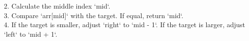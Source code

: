 \documentclass[preview]{standalone}
\begin{document}
2. Calculate the middle index `mid`.\\3. Compare `arr[mid]` with the target. If equal, return `mid`.\\4. If the target is smaller, adjust `right` to `mid - 1`. If the target is larger, adjust `left` to `mid + 1`.\\
\end{document}
